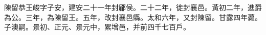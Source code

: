 \begin{pinyinscope}
 
 
 陳留恭王峻字子安，建安二十一年封郿侯。二十二年，徙封襄邑。黃初二年，進爵為公。三年，為陳留王。五年，改封襄邑縣。太和六年，又封陳留。甘露四年薨。子澳嗣。景初、正元、景元中，累增邑，并前四千七百戶。
 
 
\end{pinyinscope}